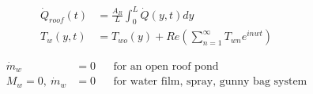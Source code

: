 \documentclass[preview,border=12pt,varwidth]{standalone}
\begin{document}
\begin{align}
  \tag{5.1} \label{eq:5.1}
    \dot{Q}_{roof}(t) &= \frac{A_R}{L} \int_{0}^{L} \dot{Q}(y,t) dy \\
  \tag{5.2} \label{eq:5.2}
    T_w(y,t) &= T_{wo}(y) + Re\left( \sum_{n=1}^{\infty} T_{wn} e^{inwt} \right)
\end{align}

\begin{align}
  \tag{i} \label{eq:i}
    \dot{m}_w&=0 && \text{for an open roof pond} \\
  \tag{ii} \label{eq:ii}
    M_w=0,\ \dot{m}_w&=0 && \text{for water film, spray, gunny bag system}
\end{align}
\end{document}
